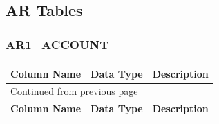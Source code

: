 \documentclass[12pt,twoside]{article}
\begin{document}
\subsection{AR Tables}
\label{sec:orgheadline93}
\subsubsection{AR1\_ACCOUNT}
\label{sec:orgheadline81}
\footnotesize

\begin{longtable}{l|l|l}
\hline
\textbf{Column Name} & \textbf{Data Type} & \textbf{Description}\\
\hline
\endfirsthead
\multicolumn{3}{l}{Continued from previous page} \\
\hline

\textbf{Column Name} & \textbf{Data Type} & \textbf{Description} \\


\end{longtable}
\end{document}
